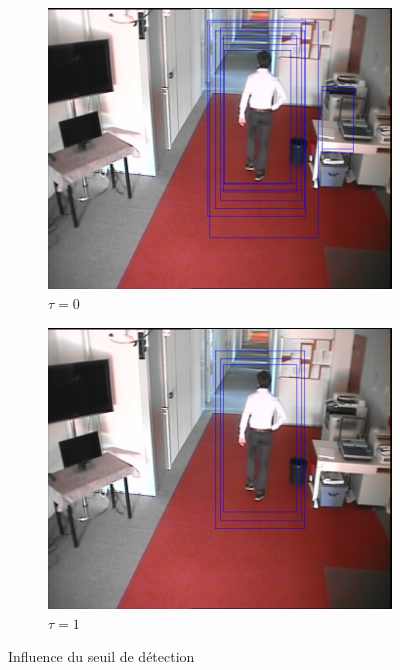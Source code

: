 \documentclass[12pt]{article}
\begin{document}
\begin{figure}[!ht]
	\centering
	\begin{subfigure}{.45\textwidth}
		\centering
		\includegraphics[clip=true,trim=300 100 50 0,width=\linewidth]{img/tau0.png}
		\caption{$\tau=0$}
	\end{subfigure}
	\begin{subfigure}{.45\textwidth}
		\centering
		\includegraphics[clip=true,trim=300 100 50 0,width=\linewidth]{img/tau1.png}
		\caption{$\tau=1$}
	\end{subfigure}
	\caption{Influence du seuil de détection}
	\label{fig:seuil}
\end{figure}\\
\end{document}

